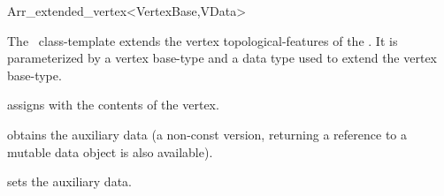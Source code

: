 
\ccRefPageBegin

\begin{ccRefClass}{Arr_extended_vertex<VertexBase,VData>}

\ccThreeToTwo

\ccDefinition
  The \ccRefName\ class-template extends the vertex
  topological-features of the \dcel. It is parameterized by a
  vertex base-type  and a data type  used to extend
  the vertex base-type.


\ccIsModel

\ccInheritsFrom

\ccCreation
{}
  {assigns \ccVar{} with the contents of the  vertex.}

\ccAccessFunctions

\def\ccLongParamLayout{\ccTrue}
  {obtains the auxiliary data (a non-const version, returning a reference
   to a mutable data object is also available).}
\def\ccLongParamLayout{\ccFalse}

\ccModifiers
  {sets the auxiliary data.}

\ccSeeAlso

\end{ccRefClass}

\ccRefPageEnd
